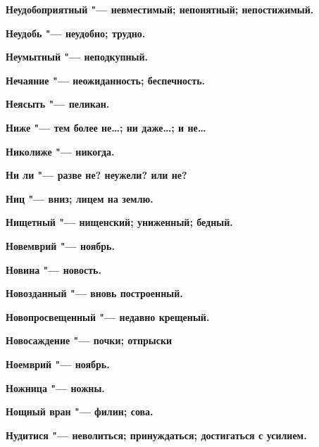 \begin{multicols}{2}
\bfseries Неудобоприятный\normalfont{} "--- невместимый; непонятный; непостижимый. 




\bfseries Неудобь\normalfont{} "--- неудобно; трудно. 




\bfseries Неумытный\normalfont{} "--- неподкупный. 




\bfseries Нечаяние\normalfont{} "--- неожиданность; беспечность. 




\bfseries Неясыть\normalfont{} "--- пеликан. 




\bfseries Ниже\normalfont{} "--- тем более не…; ни даже…; и не… 




\bfseries Николиже\normalfont{} "--- никогда. 




\bfseries Ни ли\normalfont{} "--- разве не? неужели? или не? 




\bfseries Ниц\normalfont{} "--- вниз; лицем на землю. 




\bfseries Нищетный\normalfont{} "--- нищенский; униженный; бедный. 




\bfseries Новемврий\normalfont{} "--- ноябрь. 




\bfseries Новина\normalfont{} "--- новость. 




\bfseries Новозданный\normalfont{} "--- вновь построенный. 




\bfseries Новопросвещенный\normalfont{} "--- недавно крещеный. 




\bfseries Новосаждение\normalfont{} "--- почки; отпрыски 




\bfseries Ноемврий\normalfont{} "--- ноябрь. 




\bfseries Ножница\normalfont{} "--- ножны. 




\bfseries Нощный вран\normalfont{} "--- филин; сова. 




\bfseries Нудитися\normalfont{} "--- неволиться; принуждаться; достигаться с усилием. 





\end{multicols}
